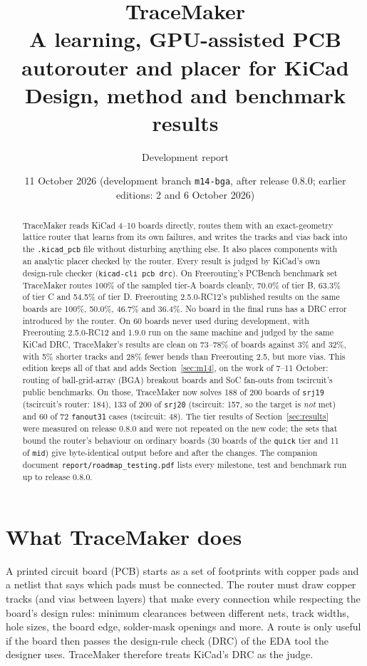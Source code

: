 \documentclass[10pt,a4paper]{article}
\title{\textbf{TraceMaker}\\[2pt]\large A learning, GPU-assisted PCB autorouter and placer for KiCad\\[2pt]
\normalsize Design, method and benchmark results}
\author{Development report}
\date{11 October 2026 (development branch \texttt{m14-bga}, after release 0.8.0; earlier editions: 2 and 6 October 2026)}
\begin{document}
\maketitle

\begin{abstract}
\noindent TraceMaker reads KiCad 4--10 boards directly, routes them with an exact-geometry lattice router
that learns from its own failures, and writes the tracks and vias back into the \texttt{.kicad\_pcb} file
without disturbing anything else. It also places components with an analytic placer checked by the router.
Every result is judged by KiCad's own design-rule checker (\texttt{kicad-cli pcb drc}). On Freerouting's PCBench
benchmark set TraceMaker routes 100\% of the sampled tier-A boards cleanly, 70.0\% of tier B, 63.3\% of tier C and
54.5\% of tier D. Freerouting 2.5.0-RC12's published results on the same boards are 100\%, 50.0\%, 46.7\% and
36.4\%. No board in the final runs has a DRC error introduced by the router. On 60 boards never used during
development, with Freerouting 2.5.0-RC12 and 1.9.0 run on the same machine and judged by the same KiCad DRC,
TraceMaker's results are clean on 73--78\% of boards against 3\% and 32\%, with 5\% shorter tracks and 28\% fewer
bends than Freerouting 2.5, but more vias. This edition keeps all of that and adds Section~\ref{sec:m14}, on the
work of 7--11 October: routing of ball-grid-array (BGA) breakout boards and SoC fan-outs from tscircuit's public
benchmarks. On those, TraceMaker now solves 188 of 200 boards of \texttt{srj19} (tscircuit's router: 184), 133 of 200
of \texttt{srj20} (tscircuit: 157, so the target is \emph{not} met) and 60 of 72 \texttt{fanout31} cases (tscircuit:
48). The tier results of Section~\ref{sec:results} were measured on release 0.8.0 and were not repeated on the new
code; the sets that bound the router's behaviour on ordinary boards (30 boards of the \texttt{quick} tier and 11 of
\texttt{mid}) give byte-identical output before and after the changes. The companion document
\texttt{report/roadmap\_testing.pdf} lists every milestone, test and benchmark run up to release 0.8.0.
\end{abstract}

\section{What TraceMaker does}

A printed circuit board (PCB) starts as a set of footprints with copper pads and a netlist that says which pads
must be connected. The router must draw copper tracks (and vias between layers) that make every connection while
respecting the board's design rules: minimum clearances between different nets, track widths, hole sizes, the
board edge, solder-mask openings and more. A route is only useful if the board then passes the design-rule check
(DRC) of the EDA tool the designer uses. TraceMaker therefore treats KiCad's DRC as the judge.
\end{document}

